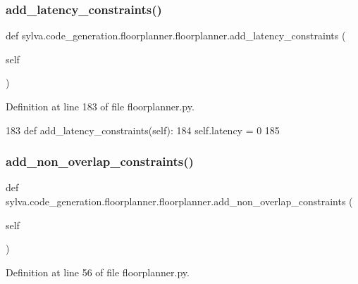 \subsubsection{\texorpdfstring{add\+\_\+latency\+\_\+constraints()}{add\_latency\_constraints()}}
{\footnotesize\ttfamily def sylva.\+code\+\_\+generation.\+floorplanner.\+floorplanner.\+add\+\_\+latency\+\_\+constraints (\begin{DoxyParamCaption}\item[{}]{self }\end{DoxyParamCaption})}



Definition at line 183 of file floorplanner.\+py.


\begin{DoxyCode}
183     \textcolor{keyword}{def }add\_latency\_constraints(self):
184         self.latency = 0
185 
\end{DoxyCode}
\mbox{\label{classsylva_1_1code__generation_1_1floorplanner_1_1floorplanner_a5e9f74cf3d397e97186ce25d8304fbe0}} 
\subsubsection{\texorpdfstring{add\+\_\+non\+\_\+overlap\+\_\+constraints()}{add\_non\_overlap\_constraints()}}
{\footnotesize\ttfamily def sylva.\+code\+\_\+generation.\+floorplanner.\+floorplanner.\+add\+\_\+non\+\_\+overlap\+\_\+constraints (\begin{DoxyParamCaption}\item[{}]{self }\end{DoxyParamCaption})}



Definition at line 56 of file floorplanner.\+py.




